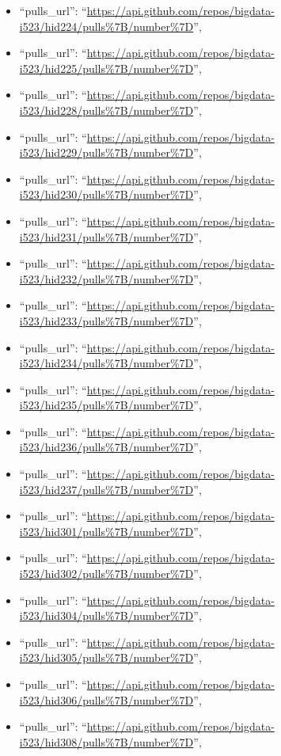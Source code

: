 \begin{itemize}
\item
  ``pulls\_url'':
  ``\url{https://api.github.com/repos/bigdata-i523/hid224/pulls\%7B/number\%7D}'',
\item
  ``pulls\_url'':
  ``\url{https://api.github.com/repos/bigdata-i523/hid225/pulls\%7B/number\%7D}'',
\item
  ``pulls\_url'':
  ``\url{https://api.github.com/repos/bigdata-i523/hid228/pulls\%7B/number\%7D}'',
\item
  ``pulls\_url'':
  ``\url{https://api.github.com/repos/bigdata-i523/hid229/pulls\%7B/number\%7D}'',
\item
  ``pulls\_url'':
  ``\url{https://api.github.com/repos/bigdata-i523/hid230/pulls\%7B/number\%7D}'',
\item
  ``pulls\_url'':
  ``\url{https://api.github.com/repos/bigdata-i523/hid231/pulls\%7B/number\%7D}'',
\item
  ``pulls\_url'':
  ``\url{https://api.github.com/repos/bigdata-i523/hid232/pulls\%7B/number\%7D}'',
\item
  ``pulls\_url'':
  ``\url{https://api.github.com/repos/bigdata-i523/hid233/pulls\%7B/number\%7D}'',
\item
  ``pulls\_url'':
  ``\url{https://api.github.com/repos/bigdata-i523/hid234/pulls\%7B/number\%7D}'',
\item
  ``pulls\_url'':
  ``\url{https://api.github.com/repos/bigdata-i523/hid235/pulls\%7B/number\%7D}'',
\item
  ``pulls\_url'':
  ``\url{https://api.github.com/repos/bigdata-i523/hid236/pulls\%7B/number\%7D}'',
\item
  ``pulls\_url'':
  ``\url{https://api.github.com/repos/bigdata-i523/hid237/pulls\%7B/number\%7D}'',
\item
  ``pulls\_url'':
  ``\url{https://api.github.com/repos/bigdata-i523/hid301/pulls\%7B/number\%7D}'',
\item
  ``pulls\_url'':
  ``\url{https://api.github.com/repos/bigdata-i523/hid302/pulls\%7B/number\%7D}'',
\item
  ``pulls\_url'':
  ``\url{https://api.github.com/repos/bigdata-i523/hid304/pulls\%7B/number\%7D}'',
\item
  ``pulls\_url'':
  ``\url{https://api.github.com/repos/bigdata-i523/hid305/pulls\%7B/number\%7D}'',
\item
  ``pulls\_url'':
  ``\url{https://api.github.com/repos/bigdata-i523/hid306/pulls\%7B/number\%7D}'',
\item
  ``pulls\_url'':
  ``\url{https://api.github.com/repos/bigdata-i523/hid308/pulls\%7B/number\%7D}'',

\end{itemize}
